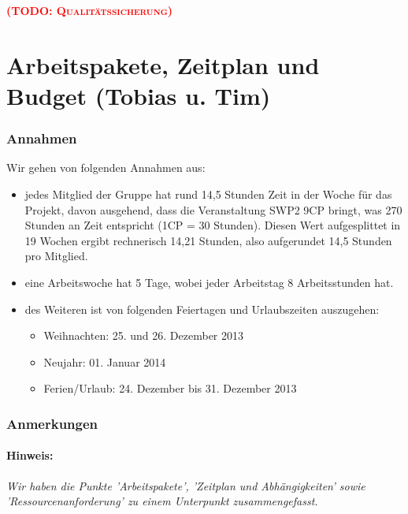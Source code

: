 \documentclass[fontsize=12pt,paper=a4,twoside]{scrartcl}
\newcommand{\todo}[1]{\textbf{\textsc{\textcolor{red}{(TODO: #1)}}}}
\begin{document}

\todo{Qualitätssicherung}


\section{Arbeitspakete, Zeitplan und Budget (Tobias u. Tim)}

\subsubsection{Annahmen}\label{aps}

Wir gehen von folgenden Annahmen aus: \\
\begin{itemize}
\item jedes Mitglied der Gruppe hat rund 14,5 Stunden Zeit in der Woche für das Projekt, davon ausgehend, dass die Veranstaltung SWP2 9CP bringt, was 270 Stunden an Zeit entspricht (1CP = 30 Stunden). Diesen Wert aufgesplittet in 19 Wochen ergibt rechnerisch 14,21 Stunden, also aufgerundet 14,5 Stunden pro Mitglied.

\item eine Arbeitswoche hat 5 Tage, wobei jeder Arbeitstag 8 Arbeitsstunden hat.

\item des Weiteren ist von folgenden Feiertagen und Urlaubszeiten auszugehen:
\begin{itemize}
\item Weihnachten: 25. und 26. Dezember 2013
\item Neujahr: 01. Januar 2014
\item Ferien/Urlaub: 24. Dezember bis 31. Dezember 2013
\end{itemize}
\end{itemize}
\subsubsection{Anmerkungen}\label{aps}
\paragraph{Hinweis:} \textit{Wir haben die Punkte 'Arbeitspakete', 'Zeitplan und Abhängigkeiten' sowie 'Ressourcenanforderung' zu einem Unterpunkt zusammengefasst.}\\
\end{document}
